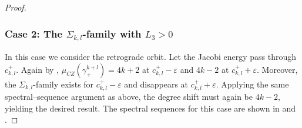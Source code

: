\documentclass{amsart}
\newcommand{\g}{\gamma}
\newcommand{\eps}{\varepsilon}
\begin{document}
\begin{proof}
	\subsubsection*{Case 2: The $\Sigma_{k,l}$-family with $L_3 > 0$}
	
	In this case we consider the retrograde orbit.  
	Let the Jacobi energy pass through $c_{k,l}^+$.  
	Again by ,
	$\mu_{CZ}(\g_+^{k+l}) = 4k + 2$ at $c_{k,l}^+ - \eps$ and $4k - 2$ at $c_{k,l}^+ + \eps$.
	Moreover, the $\Sigma_{k,l}$-family exists for $c_{k,l}^+ - \eps$ and disappears at $c_{k,l}^+ + \eps$.  
	Applying the same spectral–sequence argument as above, the degree shift must again be $4k - 2$, yielding the desired result.  
	The spectral sequences for this case are shown in  and .
	
\end{proof}
\end{document}
